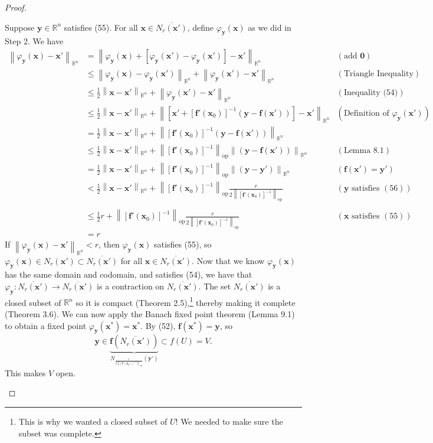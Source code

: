 \documentclass{article}
\newcommand{\R}{\mathbb{R}}
\newcommand{\x}{\mathbf{x}}
\newcommand{\f}{\mathbf{f}}
\newcommand{\y}{\mathbf{y}}
\newcommand{\ze}{\mathbf{0}}
\newcommand{\norm}[1]{\left\lVert#1\right\rVert}
\newcommand{\normop}[1]{\left\lVert#1\right\rVert_\text{op}}
\theoremstyle{definition}
\begin{document}
\begin{proof}
\begin{enumerate}
 
 Suppose $ \y\in \R^n $ satisfies (55). For all $ \x\in\overline{N_r(\x')}  $, define $ \varphi_{\y}(\x) $ as we did in Step 2. We have 
 \begin{align*}
 	\norm{\varphi_{\y}(\x) - \x'}_{\R^n}& =	\norm{\varphi_{\y}(\x) + \left[\varphi_{\y}(\x') -\varphi_{\y}(\x') \right]  - \x'}_{\R^n} & (\text{add }\ze)\\ 
 	& \le \norm{\varphi_{\y}(\x) - \varphi_{\y}(\x')}_{\R^n}  + \norm{\varphi_{\y}(\x')  - \x'}_{\R^n} & (\text{Triangle Inequality})\\ & 
 	\le \frac{1}{2}\norm{\x-\x'}_{\R^n} + \norm{\varphi_\y(\x')  - \x'}_{\R^n} & (\text{Inequality (54)})\\
 	& 
 	\le \frac{1}{2}\norm{\x-\x'}_{\R^n} + \norm{\left[\x' + [\f'(\x_0)]^{-1}(\y - \f(\x'))\right] - \x'}_{\R^n} & (\text{Definition of }\varphi_{\y}(\x')) \\ & = 	 \frac{1}{2}\norm{\x-\x'}_{\R^n} + \norm{ [\f'(\x_0)]^{-1}(\y - \f(\x'))}_{\R^n} \\ &\le  \frac{1}{2}\norm{\x-\x'}_{\R^n} + \normop{[\f'(\x_0)]^{-1}}\norm{(\y - \f(\x'))}_{\R^n} & (\text{Lemma 8.1}) \\
 	&=  \frac{1}{2}\norm{\x-\x'}_{\R^n} + \normop{[\f'(\x_0)]^{-1}}\norm{(\y - \y')}_{\R^n} & (\f(\x')=\y') \\
 	& < \frac{1}{2}\norm{\x-\x'}_{\R^n} + \normop{[\f'(\x_0)]^{-1}}\frac{r}{2\normop{[\f'(\x_0)]^{-1}}} & (\y\text{ satisfies }(56))\\ \\
 	& \le \frac{1}{2}r+ \normop{[\f'(\x_0)]^{-1}}\frac{r}{2\normop{[\f'(\x_0)]^{-1}}} & (\x\text{ satisfies }(55))\\ & = r
  \end{align*}
If $ \norm{\varphi_{\y}(\x) - \x'}_{\R^n} <r$, then $ \varphi_{\y}(\x)  $ satisfies (55), so $ \varphi_{\y}(\x)\in N_r(\x') \subset \overline{N_r(\x')}   $ for all $ \x\in\overline{N_r(\x')} $. Now that we know $ \varphi_\y(\x) $ has the same domain and codomain, and satisfies (54), we have that $ \varphi_{\y}:\overline{N_r(\x')} \to \overline{N_r(\x')}  $ is a contraction on $ \overline{N_r(\x')}  $. The set $ \overline{N_r(\x')} $ is a closed subset of $ \R^n $ so it is compact (Theorem 2.5),\footnote{This is why we wanted a closed subset of $U$! We needed to make sure the subset was complete.} thereby making it complete (Theorem 3.6). We can now apply the Banach fixed point theorem (Lemma 9.1) to obtain a fixed point $ \varphi_\y(\x^*)=\x^* $. By (52), $ \f(\x^*)=\y $, so $$ \y\in \underbrace{\f\left(\overline{N_r(\x')}\right) }_{N_{\frac{r}{2\normop{[\f'(\x_0)]^{-1}}}}(\y')}\subset f(U)=V .$$ This makes $ V $ open.

\end{enumerate}
\end{proof}
\end{document}
